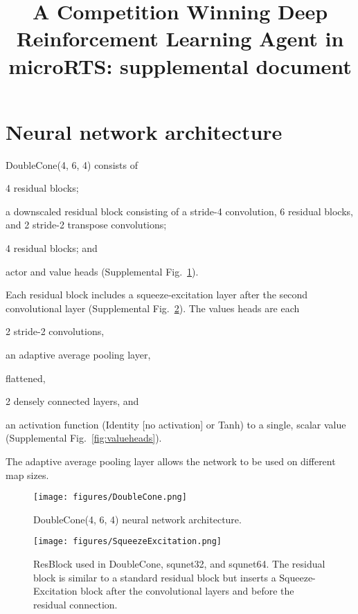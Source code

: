 \documentclass[conference,onecolumn]{IEEEtran}
\newcounter{suppfigure}
\newenvironment{suppfigure}
  {\renewcommand{\figurename}{Supplemental Fig.}\setcounter{figure}{\value{suppfigure}}\addtocounter{suppfigure}{1}\begin{figure}}
  {\end{figure}\setcounter{suppfigure}{\value{figure}}}
\begin{document}
\title{A Competition Winning Deep Reinforcement Learning Agent in microRTS: supplemental document}
\author{}
\maketitle

\section{Neural network architecture}
DoubleCone(4, 6, 4) \cite{Ferdinand2021doublecone-supp} consists of
\begin{inparaenum}[(1)]
    \item 4 residual blocks;
    \item a downscaled residual block consisting of a stride-4 convolution, 6 residual blocks, and
        2 stride-2 transpose convolutions;
    \item 4 residual blocks; and
    \item actor and value heads (Supplemental Fig.~\ref{suppfig:doublecone}).
\end{inparaenum}
Each residual block includes a squeeze-excitation layer after the second convolutional
layer (Supplemental Fig.~\ref{fig:squeezeexcitation}). The values heads are each 
\begin{inparaenum}[(1)]
    \item 2 stride-2 convolutions,
    \item an adaptive average pooling layer,
    \item flattened,
    \item 2 densely connected layers, and
    \item an activation function (Identity [no activation] or Tanh) to a single, scalar
    value (Supplemental Fig.~\ref{fig:valueheads}).
\end{inparaenum}
The adaptive average pooling layer allows the network to be used on different map sizes.

\begin{suppfigure}[H]
    \begin{center}
        \texttt{[image: figures/DoubleCone.png]}
    \end{center}
    \caption{DoubleCone(4, 6, 4) neural network architecture.}
    \label{suppfig:doublecone}
\end{suppfigure}

\begin{suppfigure}[H]
    \begin{center}
        \texttt{[image: figures/SqueezeExcitation.png]}
    \end{center}
    \caption{ResBlock used in DoubleCone, squnet32, and squnet64. The residual block is similar to a standard residual block but inserts a Squeeze-Excitation block after the convolutional layers and before the residual connection.}
    \label{fig:squeezeexcitation}
\end{suppfigure}
\end{document}

